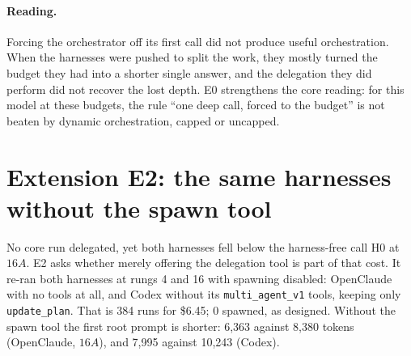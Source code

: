 \documentclass[11pt]{article}
\begin{document}
\paragraph{Reading.} Forcing the orchestrator off its first call did not produce useful orchestration. When
the harnesses were pushed to split the work, they mostly turned the budget they had into a shorter single answer,
and the delegation they did perform did not recover the lost depth. E0 strengthens the core reading: for this
model at these budgets, the rule ``one deep call, forced to the budget'' is not beaten by dynamic orchestration,
capped or uncapped.

\section{Extension E2: the same harnesses without the spawn tool}\label{sec:e2}

No core run delegated, yet both harnesses fell below the harness-free call H0 at $16A$. E2 asks whether merely
offering the delegation tool is part of that cost. It re-ran both harnesses at rungs 4 and 16 with spawning
disabled: OpenClaude with no tools at all, and Codex without its \texttt{multi\_agent\_v1} tools, keeping only
\texttt{update\_plan}. That is 384 runs for \$6.45; 0 spawned, as designed.
Without the spawn tool the first root prompt is shorter: 6,363 against
8,380 tokens (OpenClaude, $16A$), and
7,995 against 10,243 (Codex).

\begin{table}[h]
\centering\small
{}
\caption{E2 cells: macro accuracy and paired differences in points (95\% item bootstrap, descriptive). ``Spawn
offered'' is the mean of the core cell and its E1 repeat.}
\label{tab:e2}
\end{table}
\end{document}
